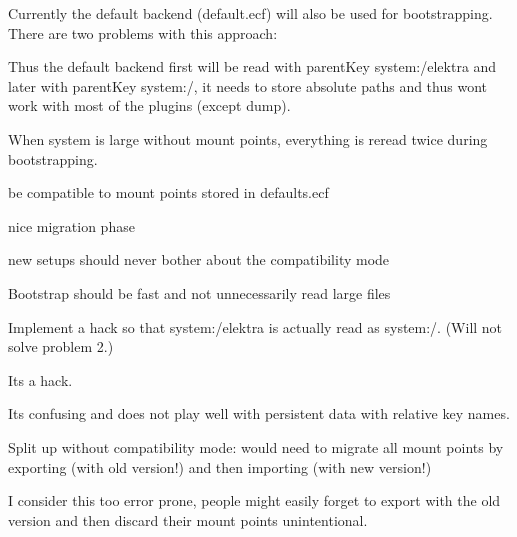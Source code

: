 Currently the default backend (default.\+ecf) will also be used for bootstrapping. There are two problems with this approach\+:


\begin{DoxyEnumerate}
\item Thus the default backend first will be read with parent\+Key {\ttfamily system\+:/elektra} and later with parent\+Key {\ttfamily system\+:/}, it needs to store absolute paths and thus won\textquotesingle{}t work with most of the plugins (except dump).
\item When {\ttfamily system} is large without mount points, everything is reread twice during bootstrapping.
\end{DoxyEnumerate}


\begin{DoxyItemize}
\item be compatible to mount points stored in {\ttfamily defaults.\+ecf}
\item nice migration phase
\item new setups should never bother about the compatibility mode
\end{DoxyItemize}


\begin{DoxyItemize}
\item Bootstrap should be fast and not unnecessarily read large files
\end{DoxyItemize}


\begin{DoxyItemize}
\item Implement a hack so that {\ttfamily system\+:/elektra} is actually read as {\ttfamily system\+:/}. (Will not solve problem 2.)
\begin{DoxyItemize}
\item Its a hack.
\item Its confusing and does not play well with persistent data with relative key names.
\end{DoxyItemize}
\item Split up without compatibility mode\+: would need to migrate all mount points by exporting (with old version!) and then importing (with new version!)
\begin{DoxyItemize}
\item I consider this too error prone, people might easily forget to export with the old version and then discard their mount points unintentional.
\end{DoxyItemize}
\end{DoxyItemize}

